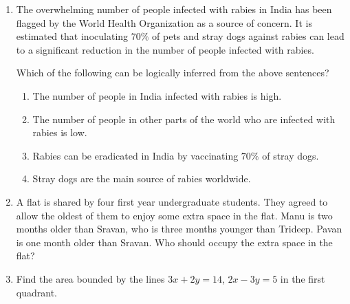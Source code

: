 \documentclass[journal]{IEEEtran}
\numberwithin{equation}{enumi}
\numberwithin{figure}{enumi}
\begin{document}
\begin{enumerate}
\item The overwhelming number of people infected with rabies in India has been flagged by the World Health Organization as a source of concern. It is estimated that inoculating $70\%$ of pets and stray dogs against rabies can lead to a significant reduction in the number of people infected with rabies.

Which of the following can be logically inferred from the above sentences?

\begin{enumerate}

\item The number of people in India infected with rabies is high.
\item The number of people in other parts of the world who are infected with rabies is low.
\item Rabies can be eradicated in India by vaccinating $70\%$ of stray dogs.
\item Stray dogs are the main source of rabies worldwide.

\end{enumerate}

\hfill{}

\item A flat is shared by four first year undergraduate students. They agreed to allow the oldest of them to enjoy some extra space in the flat. Manu is two months older than Sravan, who is three months younger than Trideep. Pavan is one month older than Sravan. Who should occupy the extra space in the flat?

\begin{enumerate}
\end{enumerate}

\hfill{}

\item Find the area bounded by the lines $3x + 2y = 14$, $2x - 3y = 5$ in the first quadrant.

\begin{enumerate}
\end{enumerate}


\end{enumerate}
\end{document}
